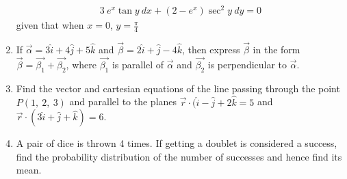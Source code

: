 \documentclass[journal,12pt,twocolumn]{IEEEtran}
\renewcommand\thesection{\arabic{section}}
\begin{document}
\begin{enumerate}[label=\thesection.\arabic*.,ref=\thesection.\theenumi]
\begin{align}
3\ e^{x}\tan y \ dx + (2-e^{x})\sec^{2}y\ dy =0 \nonumber
\end{align}
given that when $x=0$, $y=\frac{\pi}{4}$\\
\item If $\overrightarrow{\alpha} = 3\hat{i}+ 4\hat{j}+5\hat{k}$ and $\overrightarrow{\beta}=2\hat{i}+\hat{j}-4\hat{k}$, then express $\overrightarrow{\beta}$ in the form $\overrightarrow{\beta}=\overrightarrow{\beta_1}+\overrightarrow{\beta_2}$, where $\overrightarrow{\beta_1}$ is parallel of $\overrightarrow{\alpha}$ and $\overrightarrow{\beta_2}$ is perpendicular to $\overrightarrow{\alpha}$.\\
\item Find the vector and cartesian equations of the line passing through the point $P(1,\ 2,\ 3)$ and parallel to the planes $\overrightarrow{r}\cdot(\hat{i}-\hat{j}+2\hat{k}=5$ and $\overrightarrow{r}\cdot(3\hat{i}+\hat{j}+\hat{k})=6$.\\
\item A pair of dice is thrown 4 times. If getting a doublet is considered a success, find the probability distribution of the number of successes and hence find its mean.\\ 
\end{enumerate}
\end{document}
